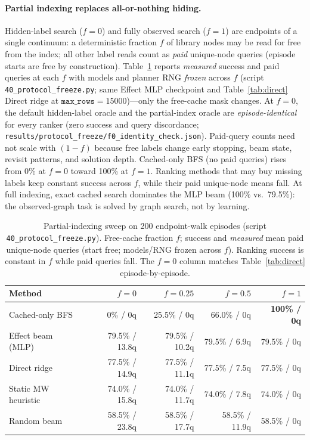 \documentclass[journal=jcisd8,manuscript=article,email=false]{achemso}
\begin{document}
\paragraph{Partial indexing replaces all-or-nothing hiding.}
Hidden-label search ($f{=}0$) and fully observed search ($f{=}1$) are endpoints of a single continuum: a deterministic fraction $f$ of library nodes may be read for free from the index; all other label reads count as \emph{paid} unique-node queries (episode starts are free by construction). Table~\ref{tab:partial} reports \emph{measured} success and paid queries at each $f$ with models and planner RNG \emph{frozen} across $f$ (script \texttt{40\_protocol\_freeze.py}; same Effect MLP checkpoint and Table~\ref{tab:direct} Direct ridge at $\texttt{max\_rows}{=}15000$)---only the free-cache mask changes. At $f{=}0$, the default hidden-label oracle and the partial-index oracle are \emph{episode-identical} for every ranker (zero success and query discordance; \texttt{results/protocol\_freeze/f0\_identity\_check.json}). Paid-query counts need not scale with $(1{-}f)$ because free labels change early stopping, beam state, revisit patterns, and solution depth. Cached-only BFS (no paid queries) rises from 0\% at $f{=}0$ toward 100\% at $f{=}1$. Ranking methods that may buy missing labels keep constant success across $f$, while their paid unique-node means fall. At full indexing, exact cached search dominates the MLP beam (100\% vs.\ 79.5\%): the observed-graph task is solved by graph search, not by learning.

\begin{table}[t]
\caption{Partial-indexing sweep on 200 endpoint-walk episodes (script \texttt{40\_protocol\_freeze.py}). Free-cache fraction $f$; success and \emph{measured} mean paid unique-node queries (start free; models/RNG frozen across $f$). Ranking success is constant in $f$ while paid queries fall. The $f{=}0$ column matches Table~\ref{tab:direct} episode-by-episode.}
\label{tab:partial}
\centering
\small
\begin{tabular}{lrrrr}
\toprule
Method & $f{=}0$ & $f{=}0.25$ & $f{=}0.5$ & $f{=}1$ \\
\midrule
Cached-only BFS & 0\% / 0q & 25.5\% / 0q & 66.0\% / 0q & \textbf{100\% / 0q} \\
Effect beam (MLP) & 79.5\% / 13.8q & 79.5\% / 10.2q & 79.5\% / 6.9q & 79.5\% / 0q \\
Direct ridge & 77.5\% / 14.9q & 77.5\% / 11.1q & 77.5\% / 7.5q & 77.5\% / 0q \\
Static MW heuristic & 74.0\% / 15.8q & 74.0\% / 11.7q & 74.0\% / 7.8q & 74.0\% / 0q \\
Random beam & 58.5\% / 23.8q & 58.5\% / 17.7q & 58.5\% / 11.9q & 58.5\% / 0q \\
\bottomrule
\end{tabular}
\end{table}
\end{document}
